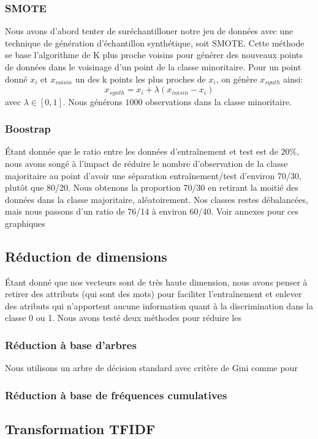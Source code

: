 \documentclass{article}
\begin{document}
\subsubsection{SMOTE}
Nous avons d'abord tenter de suréchantilloner notre jeu de données avec une technique de génération d'échantillon synthétique, soit SMOTE. Cette méthode se base l'algorithme de K plus proche voisins pour générer des nouveaux points de données dans le voisinage d'un point de la classe minoritaire. Pour un point donné $x_i$ et $x_{voisin}$ un des k points les plus proches de $x_i$, on génère $x_{synth}$ ainsi:\\
$$x_{synth} = x_i + \lambda (x_{voisin} - x_i)$$ avec $\lambda \in [0, 1]$.
Nous générons $1000$ observations dans la classe minoritaire.
\subsubsection{Boostrap}
Étant donnée que le ratio entre les données d'entraînement et test est de $20\%$, nous avons songé à l'impact de réduire le nombre d'observation de la classe majoritaire au point d'avoir une séparation entraînement/test d'environ 70/30, plutôt que 80/20. Nous obtenons la proportion 70/30 en retirant la moitié des données dans la classe majoritaire, aléatoirement. Nos classes restes débalancées, mais nous passons d'un ratio de 76/14 à environ 60/40. Voir annexes pour ces graphiques
\subsection{Réduction de dimensions}
Étant donné que nos vecteurs sont de très haute dimension, nous avons penser à retirer des attributs (qui sont des mots) pour faciliter l'entraînement et enlever des atributs qui n'apportent aucune information quant à la discrimination dans la classe 0 ou 1. Nous avons testé deux méthodes pour réduire les 
\subsubsection{Réduction à base d'arbres}
Nous utilisons un arbre de décision standard avec critère de Gini comme pour 
\subsubsection{Réduction à base de fréquences cumulatives}
\subsection{Transformation TFIDF}
\end{document}

